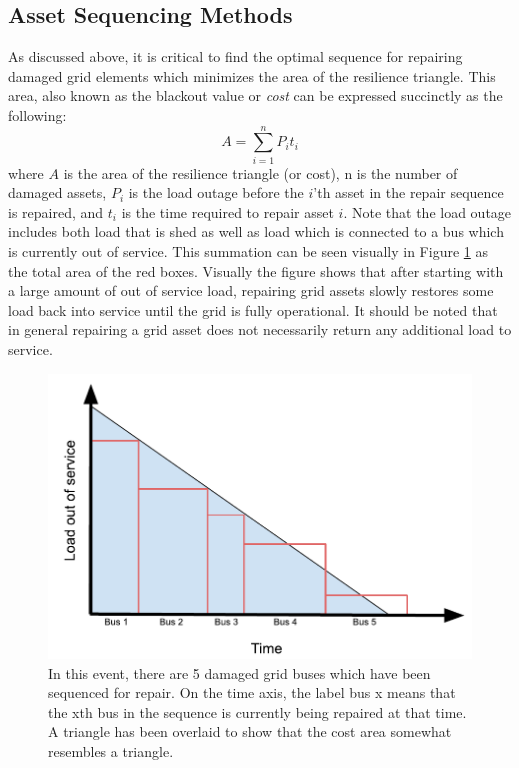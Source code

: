 \documentclass[12pt]{article}
\begin{document}
\subsection{Asset Sequencing Methods}
As discussed above, it is critical to find the optimal sequence for repairing damaged grid elements which minimizes the area of the resilience triangle. This area, also known as the blackout value or \textit{cost} can be expressed succinctly as the following:
\begin{equation} 
    A=\sum_{i=1}^{n}{P_it_i}
    \label{eq:cost}
\end{equation}
where $A$ is the area of the resilience triangle (or cost), n is the number of damaged assets, $P_i$ is the load outage before the $i$’th asset in the repair sequence is repaired, and $t_i$ is the time required to repair asset $i$. Note that the load outage includes both load that is shed as well as load which is connected to a bus which is currently out of service. This summation can be seen visually in Figure \ref{fig:costfigure} as the total area of the red boxes.  Visually the figure shows that after starting with a large amount of out of service load, repairing grid assets slowly restores some load back into service until the grid is fully operational. It should be noted that in general repairing a grid asset does not necessarily return any additional load to service. \par
\begin{figure}[ht]
    \centering %
    \includegraphics[scale = 0.9]{costfigure.pdf}
    \caption[Cost (blackout value) formula visualized]{In this event, there are 5 damaged grid buses which have been sequenced for repair. On the time axis, the label bus x means that the xth bus in the sequence is currently being repaired at that time. A triangle has been overlaid to show that the cost area somewhat resembles a triangle.}
    \label{fig:costfigure}
\end{figure}
\end{document}
